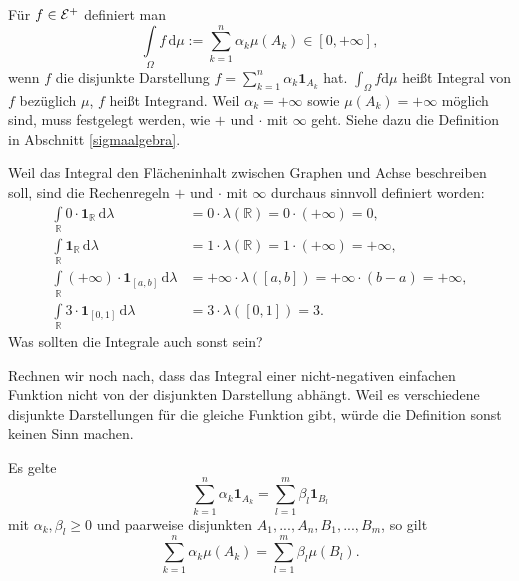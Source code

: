 \begin{deff}
	Für $f \in \mathcal{E}^+$ definiert man \[ \int\limits_{\Omega} f \,\mathrm{d}\mu := \sum\limits_{k = 1}^{n} \alpha_k \mu(A_k) \in [0,+\infty], \] wenn $f$ die disjunkte Darstellung $f = \sum\limits_{k = 1}^{n} \alpha_k \mathbf{1}_{A_k}$ hat. $\int_\Omega f\mathrm{d}\mu$ hei\ss t Integral von $f$ bez\"uglich $\mu$, $f$ hei\ss t Integrand. Weil $\alpha_k = + \infty$ sowie $\mu(A_k) = +\infty$ möglich sind, muss festgelegt werden, wie $+$ und $\cdot$ mit $\infty$ geht. Siehe dazu die Definition in Abschnitt \ref{sigmaalgebra}.
\end{deff}

\begin{beispiel1}
Weil das Integral den \glqq Fl\"acheninhalt\grqq{} zwischen Graphen und Achse beschreiben soll, sind die Rechenregeln $+$ und $\cdot$ mit $\infty$ durchaus sinnvoll definiert worden:
\begin{align*}
	 \int\limits_{\mathbb{R}} 0 \cdot \mathbf {1}_{\mathbb R} \,\mathrm{d}\lambda  &= 0\cdot \lambda(\mathbb{R} )= 0 \cdot (+\infty) = 0,\\
	 \int\limits_{\mathbb{R}} \mathbf{1}_{\mathbb R}\, \mathrm{d}\lambda &= 1 \cdot \lambda(\mathbb{R})= 1 \cdot (+\infty) = +\infty,\\
	 \int\limits_{\mathbb{R}} (+\infty)\cdot  \mathbf{1}_{[a,b]} \,\mathrm{d}\lambda &= +\infty \cdot \lambda([a,b] )= +\infty\cdot (b-a)=+\infty,\\
	 \int\limits_{\mathbb{R}} 3\cdot \mathbf{1}_{[0,1]}\, \mathrm{d}\lambda &= 3 \cdot \lambda([0,1] )= 3. 
\end{align*} 	 
Was sollten die Integrale auch sonst sein?
\end{beispiel1}

Rechnen wir noch nach, dass das Integral einer nicht-negativen einfachen Funktion nicht von der disjunkten Darstellung abh\"angt. Weil es verschiedene disjunkte Darstellungen f\"ur die gleiche Funktion gibt, w\"urde die Definition sonst keinen Sinn machen.
\begin{lemma}
	Es gelte \[  \sum\limits_{k = 1}^{n} \alpha_k \mathbf{1}_{A_k} = \sum\limits_{l = 1}^{m} \beta_l \mathbf{1}_{B_l} \]
	mit $ \alpha_k, \beta_l \geq 0$ und paarweise disjunkten $A_1,...,A_n,B_1,...,B_m$, so gilt \[ \sum\limits_{k = 1}^{n} \alpha_k \mu(A_k) = \sum\limits_{l = 1}^{m} \beta_l \mu(B_l). \]
\end{lemma}


